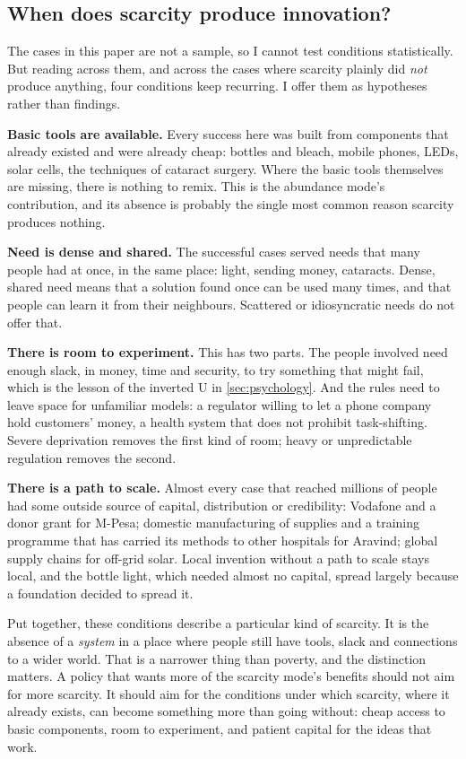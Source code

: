 \subsection{When does scarcity produce innovation?}

The cases in this paper are not a sample, so I cannot test conditions
statistically. But reading across them, and across the cases where scarcity
plainly did \emph{not} produce anything, four conditions keep recurring. I
offer them as hypotheses rather than findings.

\textbf{Basic tools are available.} Every success here was built from
components that already existed and were already cheap: bottles and bleach,
mobile phones, LEDs, solar cells, the techniques of cataract surgery. Where
the basic tools themselves are missing, there is nothing to remix. This is the
abundance mode's contribution, and its absence is probably the single most
common reason scarcity produces nothing.

\textbf{Need is dense and shared.} The successful cases served needs that many
people had at once, in the same place: light, sending money, cataracts. Dense,
shared need means that a solution found once can be used many times, and that
people can learn it from their neighbours. Scattered or idiosyncratic needs
do not offer that.

\textbf{There is room to experiment.} This has two parts. The people involved
need enough slack, in money, time and security, to try something that might
fail, which is the lesson of the inverted U in \cref{sec:psychology}. And the
rules need to leave space for unfamiliar models: a regulator willing to let
a phone company hold customers' money, a health system that does not prohibit
task-shifting. Severe deprivation removes the first kind of room; heavy or
unpredictable regulation removes the second.

\textbf{There is a path to scale.} Almost every case that reached millions of
people had some outside source of capital, distribution or credibility:
Vodafone and a donor grant for M-Pesa; domestic manufacturing of supplies and a
training programme that has carried its methods to other hospitals for
Aravind; global supply chains for off-grid solar. Local invention without a path to scale stays local, and
the bottle light, which needed almost no capital, spread largely because a
foundation decided to spread it.

Put together, these conditions describe a particular kind of scarcity. It is
the absence of a \emph{system} in a place where people still have tools,
slack and connections to a wider world. That is a narrower thing than poverty,
and the distinction matters. A policy that wants more of the scarcity mode's
benefits should not aim for more scarcity. It should aim for the conditions
under which scarcity, where it already exists, can become something more than
going without: cheap access to basic components, room to experiment, and
patient capital for the ideas that work.
